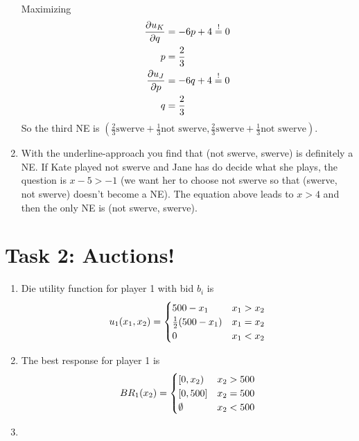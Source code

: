 \documentclass{article}
\begin{document}
\begin{enumerate}[label=(\alph*)]
\begin{align}
		\end{align}
		Maximizing
		\begin{align}
			\frac{\partial u_K}{\partial q} &= -6p+4 \overset{!}{=} 0 \notag \\
			p &= \frac{2}{3} \notag \\
			\frac{\partial u_J}{\partial p} &= -6q + 4 \overset{!}{=} 0 \notag \\
			q &= \frac{2}{3} \notag
		\end{align}
		So the third NE is $\left(\frac{2}{3}\text{swerve} + \frac{1}{3}\text{not swerve}, \frac{2}{3}\text{swerve} + \frac{1}{3}\text{not swerve}\right)$.
		\item With the underline-approach you find that (not swerve, swerve) is definitely a NE. If Kate played not swerve and Jane has do decide what she plays, the question is $x-5 > -1$ (we want her to choose not swerve so that (swerve, not swerve) doesn't become a NE). The equation above leads to $x>4$ and then the only NE is (not swerve, swerve).
	\end{enumerate}

	\section*{Task 2: Auctions!}
	\begin{enumerate}[label=(\alph*)]
		\item Die utility function for player 1 with bid $b_i$ is
		\begin{align}
			u_1(x_1,x_2) = \begin{cases}
				500-x_1 & x_1>x_2 \\
				\frac{1}{2}(500-x_1) & x_1=x_2 \\
				0 & x_1 < x_2
			\end{cases} \notag
		\end{align}
		\item The best response for player 1 is
		\begin{align}
			BR_1(x_2) = \begin{cases}
				[0,x_2) & x_2 > 500 \\
				[0,500] & x_2 = 500 \\
				\emptyset & x_2 < 500
			\end{cases} \notag
		\end{align}
		\item
	\end{enumerate}
	
\end{document}
